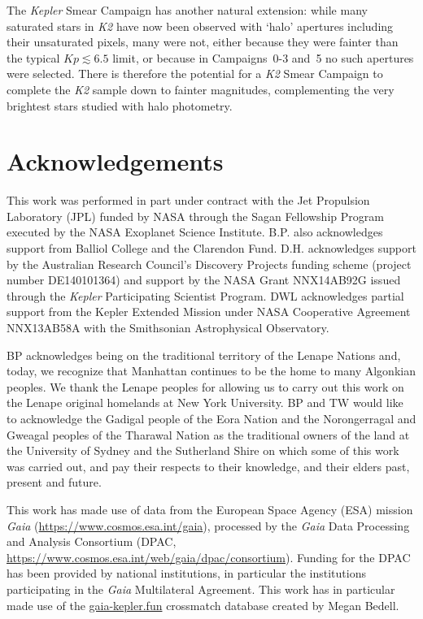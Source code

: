 \documentclass[a4paper,fleqn,usenatbib]{mnras}
\newcommand{\kepler}{\emph{Kepler}\xspace}
\newcommand{\ktwo}{\emph{K2}\xspace}
\begin{document}
The \kepler Smear Campaign has another natural extension: while many saturated stars in \ktwo have now been observed with `halo' apertures including their unsaturated pixels, many were not, either because they were fainter than the typical $Kp \lesssim 6.5$ limit, or because in Campaigns~0-3 and~5 no such apertures were selected. There is therefore the potential for a \ktwo Smear Campaign to complete the \ktwo sample down to fainter magnitudes, complementing the very brightest stars studied with halo photometry. 


\section*{Acknowledgements} %

This work was performed in part under contract with the Jet Propulsion Laboratory (JPL) funded by NASA through the Sagan Fellowship Program executed by the NASA Exoplanet Science Institute. B.P. also acknowledges support from Balliol College and the Clarendon Fund. D.H. acknowledges support by the Australian Research Council's Discovery Projects funding scheme (project number DE140101364) and support by the NASA Grant NNX14AB92G issued through the \emph{Kepler} Participating Scientist Program. DWL acknowledges partial support from the Kepler Extended Mission under NASA Cooperative Agreement NNX13AB58A with the Smithsonian Astrophysical Observatory.

BP acknowledges being on the traditional territory of the Lenape Nations and, today, we recognize that Manhattan continues to be the home to many Algonkian peoples. We thank the Lenape peoples for allowing us to carry out this work on the Lenape original homelands at New York University. BP and TW would like to acknowledge the Gadigal people of the Eora Nation and the Norongerragal and Gweagal peoples of the Tharawal Nation as the traditional owners of the land at the University of Sydney and the Sutherland Shire on which some of this work was carried out, and pay their respects to their knowledge, and their elders past, present and future.

This work has made use of data from the European Space Agency (ESA) mission
{\it Gaia} (\url{https://www.cosmos.esa.int/gaia}), processed by the {\it Gaia}
Data Processing and Analysis Consortium (DPAC,
\url{https://www.cosmos.esa.int/web/gaia/dpac/consortium}). Funding for the DPAC
has been provided by national institutions, in particular the institutions
participating in the {\it Gaia} Multilateral Agreement. This work has in particular made use of the \url{gaia-kepler.fun} crossmatch database created by Megan Bedell.
\end{document}
